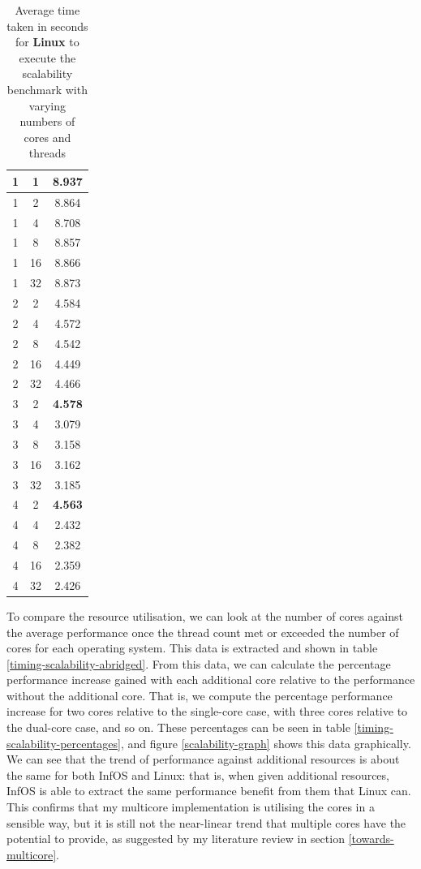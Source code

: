 \documentclass[bsc,frontabs,singlespacing,parskip,deptreport]{infthesis}
\begin{document}
\begin{table}[h]
{\begin{tabular}{ccc}
\midrule
1 &1 &8.937 \\
\midrule
1 &2 &8.864 \\
1 &4 &8.708 \\
1 &8 &8.857 \\
1 &16 &8.866 \\
1 &32 &8.873 \\
\midrule
2 &2 &4.584 \\
2 &4 &4.572 \\
2 &8 &4.542 \\
2 &16 &4.449 \\
2 &32 &4.466 \\
\midrule
3 &2 &\textbf{4.578} \\
3 &4 &3.079 \\
3 &8 &3.158 \\
3 &16 &3.162 \\
3 &32 &3.185 \\
\midrule
4 &2 &\textbf{4.563} \\
4 &4 &2.432 \\
4 &8 &2.382 \\
4 &16 &2.359 \\
4 &32 &2.426 \\
\bottomrule
\end{tabular}
\caption{Average time taken in seconds for \textbf{Linux} to execute the scalability benchmark with varying numbers of cores and threads}\label{timing-scalability-linux}
}
\end{table}

To compare the resource utilisation, we can look at the number of cores against the average performance once the thread count met or exceeded the number of cores for each operating system. This data is extracted and shown in table \ref{timing-scalability-abridged}. From this data, we can calculate the percentage performance increase gained with each additional core relative to the performance without the additional core. That is, we compute the percentage performance increase for two cores relative to the single-core case, with three cores relative to the dual-core case, and so on. These percentages can be seen in table \ref{timing-scalability-percentages}, and figure \ref{scalability-graph} shows this data graphically. We can see that the trend of performance against additional resources is about the same for both InfOS and Linux: that is, when given additional resources, InfOS is able to extract the same performance benefit from them that Linux can. This confirms that my multicore implementation is utilising the cores in a sensible way, but it is still not the near-linear trend that multiple cores have the potential to provide, as suggested by my literature review in section \ref{towards-multicore}.
\end{document}
